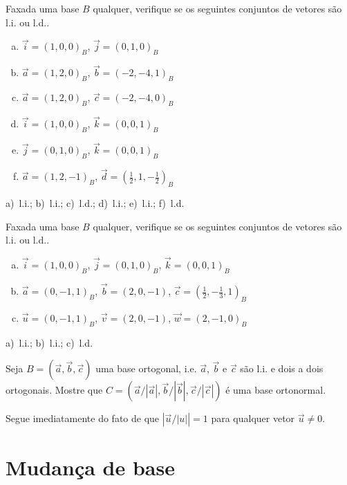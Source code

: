 \begin{exer}
  Faxada uma base $B$ qualquer, verifique se os seguintes conjuntos de vetores são l.i. ou l.d..
  \begin{enumerate}[a)]
  \item $\vec{i}=(1,0,0)_B$, $\vec{j}=(0,1,0)_B$
  \item $\vec{a}=(1,2,0)_B$, $\vec{b}=(-2,-4,1)_B$
  \item $\vec{a}=(1,2,0)_B$, $\vec{c}=(-2,-4,0)_B$
  \item $\vec{i}=(1,0,0)_B$, $\vec{k}=(0,0,1)_B$
  \item $\vec{j}=(0,1,0)_B$, $\vec{k}=(0,0,1)_B$
  \item $\vec{a}=(1,2,-1)_B$, $\vec{d}=(\frac{1}{2},1,-\frac{1}{2})_B$
  \end{enumerate}
\end{exer}
\begin{resp}
  a)~l.i.; b)~l.i.; c)~l.d.; d)~l.i.; e)~l.i.; f)~l.d.
\end{resp}

\begin{exer}
  Faxada uma base $B$ qualquer, verifique se os seguintes conjuntos de vetores são l.i. ou l.d..
  \begin{enumerate}[a)]
  \item $\vec{i}=(1,0,0)_B$, $\vec{j}=(0,1,0)_B$, $\vec{k}=(0,0,1)_B$
  \item $\vec{a}=(0,-1,1)_B$, $\vec{b}=(2,0,-1)$, $\vec{c}=(\frac{1}{2},-\frac{1}{3},1)_B$
  \item $\vec{u}=(0,-1,1)_B$, $\vec{v}=(2,0,-1)$, $\vec{w}=(2,-1,0)_B$
  \end{enumerate}
\end{exer}
\begin{resp}
  a)~l.i.; b)~l.i.; c)~l.d.
\end{resp}

\begin{exer}
  Seja $B = (\vec{a}, \vec{b}, \vec{c})$ uma base ortogonal, i.e. $\vec{a}$, $\vec{b}$ e $\vec{c}$ são l.i. e dois a dois ortogonais. Mostre que $C = (\vec{a}/|\vec{a}|,\vec{b}/|\vec{b}|,\vec{c}/|\vec{c}|)$ é uma base ortonormal.
\end{exer}
\begin{resp}
  Segue imediatamente do fato de que $\left|\vec{u}/|u|\right|=1$ para qualquer vetor $\vec{u}\neq 0$.
\end{resp}


\section{Mudança de base}\label{cap_base_sec_mudbas}
\badgeRevisar

